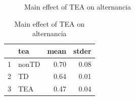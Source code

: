 \documentclass{article}
\begin{document}
\begin{figure}[H]
  \caption{Main effect of TEA on alternancia}
  \noindent{}
  \centering
\end{figure}

\begin{table}[ht]
\centering
\caption{Main effect of TEA on alternancia}
\begin{tabular}{rlrr}
  \hline
 & tea & mean & stder \\ 
  \hline
1 & nonTD & 0.70 & 0.08 \\ 
  2 & TD & 0.64 & 0.01 \\ 
  3 & TEA & 0.47 & 0.04 \\ 
   \hline
\end{tabular}
\end{table}
\end{document}
